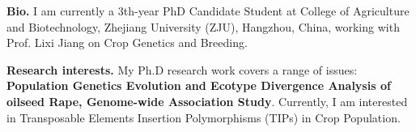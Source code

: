 %
%

\par{
{\textbf{Bio.}} 
I am currently a 3th-year PhD Candidate Student at College of Agriculture and Biotechnology, Zhejiang University (ZJU), Hangzhou, China, 
 working with Prof. Lixi Jiang on Crop Genetics and Breeding. 

{\textbf{Research interests.}} 
My Ph.D research work covers a range of issues: \textbf{Population Genetics Evolution and Ecotype Divergence Analysis of oilseed Rape, 
Genome-wide Association Study}. Currently, I am interested in Transposable Elements Insertion Polymorphisms (TIPs) in Crop Population.  
}